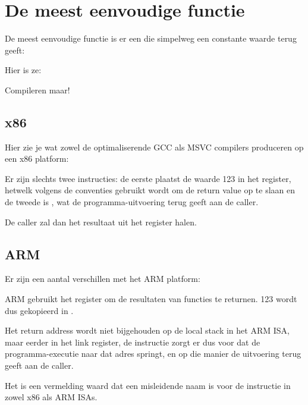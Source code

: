 \section{De meest eenvoudige functie}

De meest eenvoudige functie is er een die simpelweg een constante waarde terug geeft:

Hier is ze:



Compileren maar!

\subsection{x86}

Hier zie je wat zowel de optimaliserende GCC als MSVC compilers produceren op een x86 platform:



Er zijn slechts twee instructies: de eerste plaatst de waarde 123 in het \EAX register, hetwelk volgens de conventies gebruikt wordt om de return value op te slaan en de tweede is \RET, wat de programma-uitvoering terug geeft aan de \gls{caller}.

De caller zal dan het resultaat uit het \EAX register halen.

\subsection{ARM}

Er zijn een aantal verschillen met het ARM platform:



ARM gebruikt het register  om de resultaten van functies te returnen. 123 wordt dus gekopieerd in .

Het return address wordt niet bijgehouden op de local stack in het ARM \ac{ISA}, maar eerder in het link register, de  instructie zorgt er dus voor dat de programma-executie naar dat adres springt, en op die manier de uitvoering terug geeft aan de \gls{caller}.

Het is een vermelding waard dat \MOV een misleidende naam is voor de instructie in zowel x86 als ARM \ac{ISA}s.

